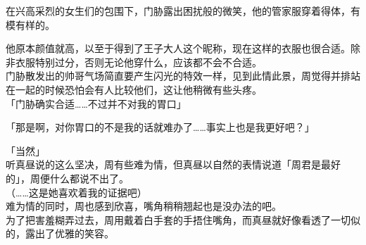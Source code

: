 在兴高采烈的女生们的包围下，门胁露出困扰般的微笑，他的管家服穿着得体，有模有样的。

他原本颜值就高，以至于得到了王子大人这个昵称，现在这样的衣服也很合适。除非衣服特别过分，否则无论他穿什么，应该都不会不合适。\\

门胁散发出的帅哥气场简直要产生闪光的特效一样，见到此情此景，周觉得并排站在一起的时候恐怕会有人比较他们，这让他稍微有些头疼。\\

「门胁确实合适……不过并不对我的胃口」

「那是啊，对你胃口的不是我的话就难办了……事实上也是我更好吧？」

「当然」\\

听真昼说的这么坚决，周有些难为情，但真昼以自然的表情说道「周君是最好的」，周便什么都说不出了。\\

（……这是她喜欢着我的证据吧）\\

难为情的同时，周也感到欣喜，嘴角稍稍翘起也是没办法的吧。\\

为了把害羞糊弄过去，周用戴着白手套的手捂住嘴角，而真昼就好像看透了一切似的，露出了优雅的笑容。
